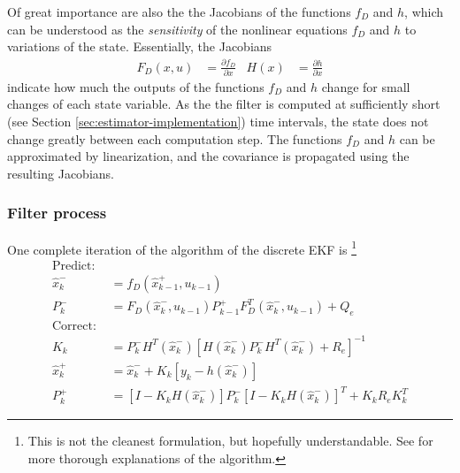 Of great importance are also the the Jacobians of the functions $f_D$ and $h$, which can be understood as the \textit{sensitivity} of the nonlinear equations $f_D$ and $h$ to variations of the state.
Essentially, the Jacobians 
\begin{align}
    F_D(x, u) &= \frac{\partial f_D}{\partial x}
    &
    H(x) &= \frac{\partial h}{\partial x}
\end{align}
indicate how much the outputs of the functions $f_D$ and $h$ change for small changes of each state variable. 
As the the filter is computed at sufficiently short (see Section \ref{sec:estimator-implementation}) time intervals, the state does not change greatly between each computation step.
The functions $f_D$ and $h$ can be approximated by linearization, and the covariance is propagated using the resulting Jacobians.

\subsubsection{Filter process}
One complete iteration of the algorithm of the discrete EKF is \cite{lewis2008, werner2021b, minh2012} \footnote{This is not the cleanest formulation, but hopefully understandable. See \cite[pp. 259]{lewis2008} for more thorough explanations of the algorithm.}
\begin{align}
    \text{Predict: } \nonumber \\
     \hat x_k^- &= f_D(\hat x_{k-1}^+, u_{k-1}) \label{eq:predict_state} \\
    P_k^- &= F_D(\hat x_k^-, u_{k-1}) P_{k-1}^+ F_D^T(\hat x_k^-, u_{k-1}) + Q_e \label{eq:predict_cova}  \\
     \text{Correct: } \nonumber \\
    K_{k} &= P_{k}^{-} H^T(\hat x_{k}^{-}) \left[ H(\hat x_{k}^{-}) P_{k}^{-} H^T(\hat x_{k}^{-}) + R_e \right]^{-1} \label{eq:update_gain} \\
    \hat x_{k}^{+} &= \hat x_{k}^{-} + K_{k} \left[ y_{k} - h(\hat x_{k}^{-}) \right] \label{eq:update_state}\\
    P_{k}^{+} &= \left[ I - K_{k} H(\hat x_{k}^{-}) \right] P_{k}^{-}\left[ I - K_{k} H(\hat x_{k}^{-}) \right]^T +  K_{k} R_e K_{k}^T \label{eq:update_cova}
\end{align}

